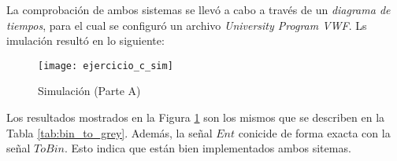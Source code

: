 \documentclass[../procedimientos.tex]{subfiles}
\begin{document}
La comprobación de ambos sistemas se llevó a cabo a través de un 
\textit{diagrama de tiempos}, para el cual se configuró un archivo 
\textit{University Program VWF}. Ls imulación resultó en lo siguiente:
\begin{figure}[H]
  \texttt{[image: ejercicio\_c\_sim]}
  \caption{Simulación (Parte A)}
  \label{fig:c_sim}
\end{figure}

Los resultados mostrados en la Figura \ref{fig:c_sim} son los mismos que se 
describen en la Tabla \ref{tab:bin_to_grey}. Además, la señal $Ent$ conicide 
de forma exacta con la señal $ToBin$. Esto indica que están bien implementados 
ambos sitemas.
\end{document}
